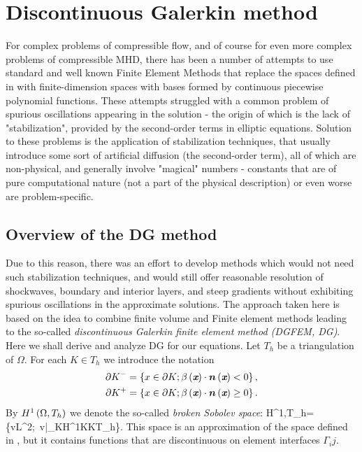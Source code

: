 \section{Discontinuous Galerkin method}

For complex problems of compressible flow, and of course for even more complex problems of compressible MHD, there has been a number of attempts to use standard and well known Finite Element Methods that replace the spaces defined in  with finite-dimension spaces with bases formed by continuous piecewise polynomial functions. These attempts struggled with a common problem of spurious oscillations appearing in the solution - the origin of which is the lack of "stabilization", provided by the second-order terms in elliptic equations. Solution to these problems is the application of stabilization techniques, that usually introduce some sort of artificial diffusion (the second-order term), all of which are non-physical, and generally involve "magical" numbers - constants that are of pure computational nature (not a part of the physical description) or even worse are problem-specific.

\subsection{Overview of the DG method}
Due to this reason, there  was an effort to develop methods which would not need such stabilization techniques, and would still offer reasonable resolution of shockwaves, boundary and interior layers, and steep gradients without exhibiting spurious oscillations in the approximate solutions. The approach taken here is based on the idea to combine finite volume and Finite element methods leading to the so-called \emph{discontinuous Galerkin finite element method (DGFEM, DG)}. Here we shall derive and analyze DG for our equations. Let $T_h$ be a triangulation of $\Omega$. For each $K\in T_h$ we introduce the notation
\begin{align}
\partial K^- & =  \left\{x\in\partial K;\beta\left(\textit{\textbf{x}}\right)\cdot\mbox{\boldmath $n$}\left(\textit{\textbf{x}}\right) <0\right\},\\
\partial K^+ & =  \left\{x\in\partial K;\beta\left(\textit{\textbf{x}}\right)\cdot\mbox{\boldmath $n$}\left(\textit{\textbf{x}}\right) \geq 0\right\}.
\end{align}
By $H^1\left(\Omega, T_h\right)$ we denote the so-called \textit{broken Sobolev space}:
\be
\label{BrokenSobolev} H^1\lo\Omega,T_h\ro = \left\{v\in L^2\lo\Omega\ro;\ v|_K\in H^1\lo K\ro \forall K\in T_h\right\}.
\ee
This space is an approximation of the space defined in , but it contains functions that are discontinuous on element interfaces $\Gamma_ij$.
